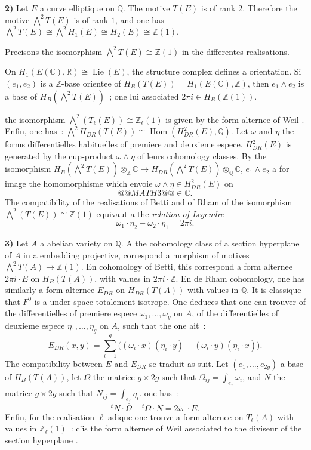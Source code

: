 \documentclass[12pt,a4paper]{article}
\theoremstyle{plain}
\theoremstyle{definition}
\theoremstyle{remark}
\DeclareMathOperator{\Lie}{Lie}
\newcommand{\ZZ}{\mathbb{Z}}
\newcommand{\QQ}{\mathbb{Q}}
\newcommand{\CC}{\mathbb{C}}
\newcommand{\RR}{\mathbb{R}}
\providecommand{\CC}{\mathbb{C}}
\providecommand{\QQ}{\mathbb{Q}}
\providecommand{\RR}{\mathbb{R}}
\providecommand{\ZZ}{\mathbb{Z}}
\providecommand{\Hom}{\operatorname{Hom}}
\providecommand{\Lie}{\operatorname{Lie}}
\begin{document}
\textbf{2)} Let $E$ a curve elliptique on $\QQ$. The motive $T(E)$ is of rank $2$. Therefore the motive $\bigwedge^2 T(E)$ is of rank $1$, and one has $\bigwedge^2 T(E) \cong \bigwedge^2 H_1(E) \cong H_2(E) \cong \ZZ(1)$.

Precisons the isomorphism $\bigwedge^2 T(E) \cong \ZZ(1)$ in the differentes realisations.

On $H_1(E(\CC), \RR) \cong \Lie(E)$, the structure complex defines a orientation. Si $(e_1, e_2)$ is a $\ZZ$-base orientee of $H_B(T(E)) = H_1(E(\CC), \ZZ)$, then $e_1 \wedge e_2$ is a base of $H_B(\bigwedge^2 T(E))$~; one lui associated $2\pi i \in H_B(\ZZ(1))$.

the isomorphism $\bigwedge^2(T_\ell(E)) \cong \ZZ_\ell(1)$ is given by the form alternee of Weil \cite{Weil1}. Enfin, one has~: $\bigwedge^2 H_{DR}(T(E)) \cong \Hom(H^2_{DR}(E), \QQ)$. Let $\omega$ and $\eta$ the forms differentielles habituelles of premiere and deuxieme espece. $H^2_{DR}(E)$ is generated by the cup-product $\omega \wedge \eta$ of leurs cohomology classes. By the isomorphism $H_B(\bigwedge^2 T(E)) \otimes_\ZZ \CC \to H_{DR}(\bigwedge^2 T(E)) \otimes_\QQ \CC$, $e_1 \wedge e_2$ a for image the homomorphisme which envoie $\omega \wedge \eta \in H^2_{DR}(E)$ on
\[
@@MATH3@@
\in \CC.
\]
The compatibility of the realisations of Betti and of Rham of the isomorphism $\bigwedge^2(T(E)) \cong \ZZ(1)$ equivaut a the \emph{relation of Legendre}
\[
\omega_1 \cdot \eta_2 - \omega_2 \cdot \eta_1 = 2\pi i.
\]

\textbf{3)} Let $A$ a abelian variety on $\QQ$. A the cohomology class of a section hyperplane of $A$ in a embedding projective, correspond a morphism of motives $\bigwedge^2 T(A) \to \ZZ(1)$. En cohomology of Betti, this correspond a form alternee $2\pi i \cdot E$ on $H_B(T(A))$, with values in $2\pi i \cdot \ZZ$. En de Rham cohomology, one has similarly a form alternee $E_{DR}$ on $H_{DR}(T(A))$ with values in $\QQ$. It is classique that $F^0$ is a under-space totalement isotrope. One deduces that one can trouver of the differentielles of premiere espece $\omega_1, \ldots, \omega_g$ on $A$, of the differentielles of deuxieme espece $\eta_1, \ldots, \eta_g$ on $A$, such that the one ait~:
\[
E_{DR}(x, y) = \sum_{i=1}^{g} \bigl((\omega_i \cdot x)(\eta_i \cdot y) - (\omega_i \cdot y)(\eta_i \cdot x)\bigr).
\]
The compatibility between $E$ and $E_{DR}$ se traduit as suit. Let $(e_1, \ldots, e_{2g})$ a base of $H_B(T(A))$, let $\Omega$ the matrice $g \times 2g$ such that $\Omega_{ij} = \int_{e_j} \omega_i$, and $N$ the matrice $g \times 2g$ such that $N_{ij} = \int_{e_j} \eta_i$. one has~:
\[
{}^t\!N \cdot \Omega - {}^t\!\Omega \cdot N = 2i\pi \cdot E.
\]
Enfin, for the realisation $\ell$-adique one trouve a form alternee on $T_\ell(A)$ with values in $\ZZ_\ell(1)$~: c'is the form alternee of Weil associated to the diviseur of the section hyperplane \cite{Weil1}.
\end{document}
